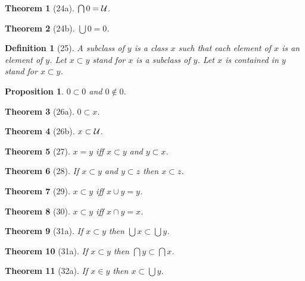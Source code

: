 \documentclass{scrartcl}
\newtheorem*{theorem}{Theorem}
\newtheorem*{definition}{Definition}
\newtheorem*{proposition}{Proposition}
\begin{document}
\begin{theorem}[24a] $\bigcap 0 = {\cal U}$.
\end{theorem}

\begin{theorem}[24b] $\bigcup 0 = 0$.
\end{theorem}

\begin{definition}[25] 
A \emph{subclass} of $y$ is a class $x$ such that each element of $x$ is an
element of $y$. Let $x \subset y$ stand for $x$ is a subclass of $y$.
Let $x$ is \emph{contained} in $y$ stand for $x \subset y$.
\end{definition}


\begin{proposition} $0 \subset 0$ and $0 \notin 0$.
\end{proposition}

\begin{theorem}[26a] $0 \subset x$.
\end{theorem}

\begin{theorem}[26b] $x \subset {\cal U}$.
\end{theorem}

\begin{theorem}[27] $x = y$ iff $x \subset y$ and $y \subset x$.
\end{theorem}

\begin{theorem}[28] If $x \subset y$ and $y \subset z$ then $x \subset z$.
\end{theorem}

\begin{theorem}[29] $x \subset y$ iff $x \cup y = y$.
\end{theorem}

\begin{theorem}[30] $x \subset y$ iff $x \cap y = x$.
\end{theorem}



\begin{theorem}[31a] If $x \subset y$ then $\bigcup x \subset \bigcup y$.
\end{theorem}

\begin{theorem}[31a] If $x \subset y$ then $\bigcap y \subset \bigcap x$.
\end{theorem}

\begin{theorem}[32a] If $x \in y$ then $x \subset \bigcup y$.
\end{theorem}
\end{document}
